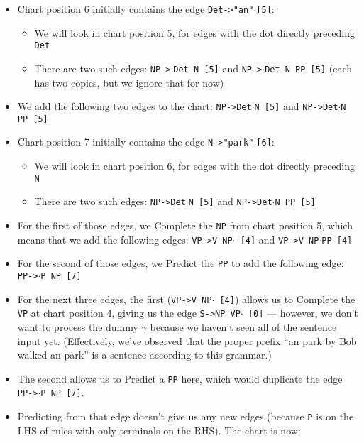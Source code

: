 \documentclass[a4paper]{article}
\begin{document}
\begin{enumerate}
\begin{enumerate}
\begin{enumerate}
\begin{itemize}
\begin{table}[ht]
\begin{tabular}{l|l|l|l}
\hline
\end{tabular}
\end{table}
\item Chart position 6 initially contains the edge \texttt{Det->"an"}$\cdot$\texttt{[5]}:
\begin{itemize}
\item We will look in chart position 5, for edges with the dot directly preceding \texttt{Det}
\item There are two such edges: \texttt{NP->}$\cdot$\texttt{Det N [5]} and \texttt{NP->}$\cdot$\texttt{Det N PP [5]} (each has two copies, but we ignore that for now)
\end{itemize}
\item We add the following two edges to the chart: \texttt{NP->Det}$\cdot$\texttt{N [5]} and \texttt{NP->Det}$\cdot$\texttt{N PP [5]}
\item Chart position 7 initially contains the edge \texttt{N->"park"}$\cdot$\texttt{[6]}:
\begin{itemize}
\item We will look in chart position 6, for edges with the dot directly preceding \texttt{N}
\item There are two such edges: \texttt{NP->Det}$\cdot$\texttt{N [5]} and \texttt{NP->Det}$\cdot$\texttt{N PP [5]}
\end{itemize}
\item For the first of those edges, we Complete the \texttt{NP} from chart position 5, which means that we add the following edges: \texttt{VP->V NP}$\cdot$\texttt{ [4]} and \texttt{VP->V NP}$\cdot$\texttt{PP [4]}
\item For the second of those edges, we Predict the \texttt{PP} to add the following edge: \texttt{PP->}$\cdot$\texttt{P NP [7]}
\item For the next three edges, the first (\texttt{VP->V NP}$\cdot$\texttt{ [4]}) allows us to Complete the \texttt{VP} at chart position 4, giving us the edge \texttt{S->NP VP}$\cdot$\texttt{ [0]} --- however, we don't want to process the dummy $\gamma$ because we haven't seen all of the sentence input yet. (Effectively, we've observed that the proper prefix ``an park by Bob walked an park'' is a sentence according to this grammar.)
\item The second allows us to Predict a \texttt{PP} here, which would duplicate the edge \texttt{PP->}$\cdot$\texttt{P NP [7]}.
\item Predicting from that edge doesn't give us any new edges (because \texttt{P} is on the LHS of rules with only terminals on the RHS). The chart is now:

\end{itemize}
\end{enumerate}
\end{enumerate}
\end{enumerate}
\end{document}
